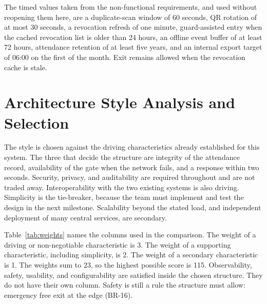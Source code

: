 \noindent
The timed values taken from the non-functional requirements, and used without reopening them here, are a duplicate-scan window of 60 seconds, QR rotation of at most 30 seconds, a revocation refresh of one minute, guard-assisted entry when the cached revocation list is older than 24 hours, an offline event buffer of at least 72 hours, attendance retention of at least five years, and an internal export target of 06:00 on the first of the month.
Exit remains allowed when the revocation cache is stale.

\section{Architecture Style Analysis and Selection}
\label{sec:style}

The style is chosen against the driving characteristics already established for this system.
The three that decide the structure are integrity of the attendance record, availability of the gate when the network fails, and a response within two seconds.
Security, privacy, and auditability are required throughout and are not traded away.
Interoperability with the two existing systems is also driving.
Simplicity is the tie-breaker, because the team must implement and test the design in the next milestone.
Scalability beyond the stated load, and independent deployment of many central services, are secondary.

Table~\ref{tab:weights} names the columns used in the comparison.
The weight of a driving or non-negotiable characteristic is 3.
The weight of a supporting characteristic, including simplicity, is 2.
The weight of a secondary characteristic is 1.
The weights sum to 23, so the highest possible score is 115.
Observability, safety, usability, and configurability are satisfied inside the chosen structure.
They do not have their own column.
Safety is still a rule the structure must allow: emergency free exit at the edge (BR-16).

